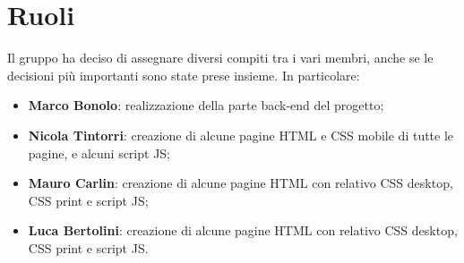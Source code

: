 \section{Ruoli}
Il gruppo ha deciso di assegnare diversi compiti tra i vari membri, anche se le decisioni più importanti sono state prese insieme. In particolare:
\begin{itemize}
	\item \textbf{Marco Bonolo}: realizzazione della parte back-end del progetto;
	\item \textbf{Nicola Tintorri}: creazione di alcune pagine HTML e CSS mobile di tutte le pagine, e alcuni script JS;
	\item \textbf{Mauro Carlin}: creazione di alcune pagine HTML con relativo CSS desktop, CSS print e script JS;
	\item \textbf{Luca Bertolini}: creazione di alcune pagine HTML con relativo CSS desktop, CSS print e script JS.
\end{itemize}